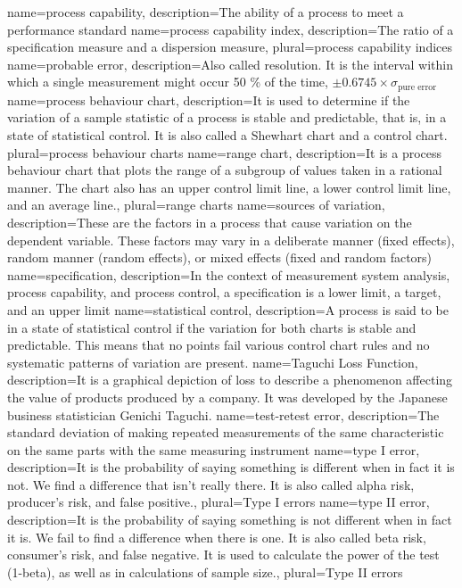 {
    name={process capability},
    description={The ability of a process to meet a performance standard}
}
{
    name={process capability index},
    description={The ratio of a specification measure and a dispersion measure},
    plural={process capability indices}
}
{
    name={probable error},
    description={Also called resolution. It is the interval within which a single measurement might occur 50 \% of the time, $\pm 0.6745 \times \sigma_\text{pure error}$}
}
{
    name={process behaviour chart},
    description={It is used to determine if the variation of a sample statistic of a process is stable and predictable, that is, in a state of statistical control. It is also called a Shewhart chart and a control chart.}
    plural={process behaviour charts}
}
{
    name={range chart},
    description={It is a process behaviour chart that plots the range of a subgroup of values taken in a rational manner. The chart also has an upper control limit line, a lower control limit line, and an average line.},
    plural={range charts}
}
{
    name={sources of variation},
    description={These are the factors in a process that cause variation on the dependent variable. These factors may vary in a deliberate manner (fixed effects), random manner (random effects), or mixed effects (fixed and random factors)}
}
{
    name={specification},
    description={In the context of measurement system analysis, process capability, and process control, a specification is a lower limit, a target, and an upper limit}
}
{
    name={statistical control},
    description={A process is said to be in a state of statistical control if the variation for both charts is stable and predictable. This means that no points fail various control chart rules and no systematic patterns of variation are present.}
}
{
    name={Taguchi Loss Function},
    description={It is a graphical depiction of loss to describe a phenomenon affecting the value of products produced by a company. It was developed by the Japanese business statistician Genichi Taguchi.}
}
{
    name={test-retest error},
    description={The standard deviation of making repeated measurements of the same characteristic on the same parts with the same measuring instrument}
}
{
    name={type I error},
    description={It is the probability of saying something is different when in fact it is not. We find a difference that isn’t really there. It is also called alpha risk, producer's risk, and false positive.},
    plural={Type I errors}
}
{
    name={type II error},
    description={It is the probability of saying something is not different when in fact it is. We fail to find a difference when there is one. It is also called beta risk, consumer’s risk, and false negative. It is used to calculate the power of the test (1-beta), as well as in calculations of sample size.},
    plural={Type II errors}
}

